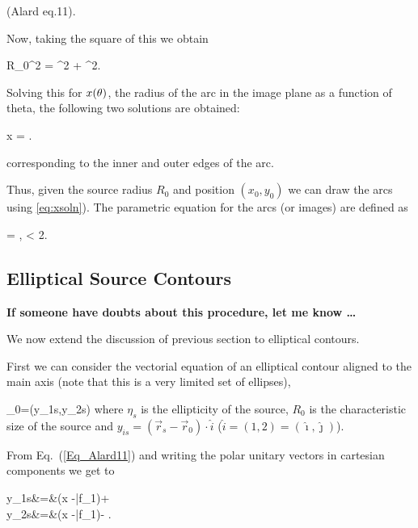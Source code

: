 (Alard eq.11).

Now, taking the square of this we obtain

\beq
R_{0}^2 = ^2 + ^2. \;\;\;
\eeq

Solving this for $x(\theta)$, the radius of the arc in the image plane as
a function of theta, the following two solutions are obtained:

\beq
\label{eq:xsoln}
x = . \;\;\;
\eeq

corresponding to the inner and outer edges of the arc.

Thus, given the source radius $R_{0}$ and position $(x_0,y_0)$ we can
draw the arcs using \eqref{eq:xsoln}). The parametric equation for the
arcs (or images) are defined as

\beq
{}= ,  \leq \te < 2\pi.
\eeq


\subsection{Elliptical Source Contours}
{\bf If someone have doubts about this procedure, let me know \ldots}

We now extend the discussion of previous section to elliptical contours.

First we can consider the vectorial equation of an elliptical contour aligned to
the main axis (note that this is a very limited set of ellipses),

\beq
\label{eq:ellipse}
_0=\left(y_{1s},y_{2s}\right)
\eeq
where $\eta_s$ is the ellipticity of the source, $R_0$ is the characteristic size of the source
and $y_{is} = (\vec{r}_s-\vec{r}_0)\cdot\hat{i}$ ($\hat{i}=(1,2)=(\hat{\imath},\hat{\jmath})$).

From Eq.~(\ref{Eq_Alard11}) and writing the polar unitary vectors in cartesian components we get to

\bea
y_{1s}&=&(\kt x -\bar{f}_1)\cos{\te}+\sin{\te} \label{y_1s}\\
y_{2s}&=&(\kt x -\bar{f}_1)\sin{\te}-\cos{\te} \label{y_2s}.
\eea

